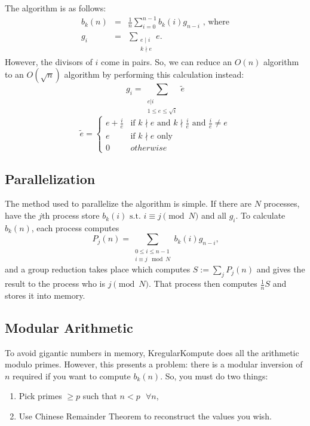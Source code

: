 \documentclass[11pt]{article}
\begin{document}
The algorithm is as follows:
\begin{eqnarray}
b_k(n) &=& \frac{1}{n}\sum_{i=0}^{n-1}{b_k(i)g_{n-i}} \mbox{ , where} \\
g_i &=& \sum_{\substack{e \mid i \\ k \nmid e}}{e}.
\end{eqnarray}
However, the divisors of $i$ come in pairs. So, we can reduce an $O(n)$ algorithm
to an $O(\sqrt{n})$ algorithm by performing this calculation instead:
\begin{equation*}
g_i = \sum_{\substack{e|i \\ 1 \leq e \leq \sqrt{i}}}{\tilde{e}}
\end{equation*}
\begin{equation*}
\tilde{e} = \left\{
\begin{array}{cl}
e + \frac{i}{e} & \mbox{if } k \nmid e \mbox{ and } k \nmid \frac{i}{e} \mbox{ and } \frac{i}{e} \neq e \\
e & \mbox{if } k \nmid e \mbox{ only} \\
0 & otherwise
\end{array}
\right.
\end{equation*}

\subsection{Parallelization}

The method used to parallelize the algorithm is simple. If there are $N$ processes, have the $j\mbox{th}$ process
store $b_k(i) \mbox{ s.t. } i \equiv j \pmod{N}$ and all $g_i$. To calculate $b_k(n)$, each process computes
\begin{equation}
P_j(n) = \sum_{\substack{0 \leq i \leq n-1 \\ i \equiv j \mod N}}{b_k(i)g_{n-i}}\mbox{,}
\end{equation}
and a group reduction takes place which computes $S := \sum_{j}{P_j(n)}$ and gives the result to the process who is
$j \pmod{N}$. That process then computes $\frac{1}{n}S$ and stores it into memory.

\subsection{Modular Arithmetic}

To avoid gigantic numbers in memory, KregularKompute does all the arithmetic modulo primes. However, this
presents a problem: there is a modular inversion of $n$ required if you want to compute $b_k(n)$.
So, you must do two things:
\begin{enumerate}
	\item Pick primes $\geq p$ such that $n < p \mbox{ } \forall n$,
	\item Use Chinese Remainder Theorem to reconstruct the values you wish.
\end{enumerate}
\end{document}
